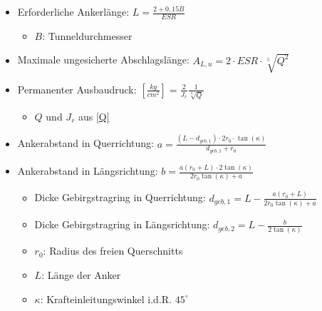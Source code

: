 \documentclass[fleqn,twoside]{article}
\begin{document}
\begin{itemize}
\begin{table}[H]
\begin{tabular}{|c p{13.3cm}|c|}
        \end{tabular}
    \end{table}
    \item Erforderliche Ankerlänge: $L=\frac{2+0,15B}{ESR}$
    \begin{itemize}
        \item $B$: Tunneldurchmesser
    \end{itemize}
    \item Maximale ungesicherte Abschlagslänge: $A_{L,u}=2\cdot ESR \cdot \sqrt[5]{Q^2}$
    \item Permanenter Ausbaudruck: $ \left[ \frac{kg}{cm^2} \right] =\frac{2}{J_r}\frac{1}{\sqrt[3]{Q}}$
    \begin{itemize}
        \item $Q$ und $J_r$ aus \autoref{Q}
    \end{itemize}
    \item Ankerabstand in Querrichtung: $a=\frac{(L-d_{geb,1})\cdot2r_0\cdot \tan(\kappa)}{d_{geb,1}+r_0}$
    \item Ankerabstand in Längsrichtung: $b=\frac{a(r_0+L)\cdot2\tan(\kappa)}{2r_0\tan(\kappa)+a}$
    \begin{itemize}
        \item Dicke Gebirgstragring in Querrichtung: $d_{geb,1}=L-\frac{a(r_0+L)}{2r_0\tan(\kappa)+a}$
        \item Dicke Gebirgstragring in Längsrichtung: $d_{geb,2}=L-\frac b{2\tan(\kappa)}$
        \item $r_0$: Radius des freien Querschnitts
        \item $L$: Länge der Anker
        \item $\kappa$: Krafteinleitungswinkel i.d.R. $45^\circ$
    \end{itemize}
\end{itemize}
\end{document}
